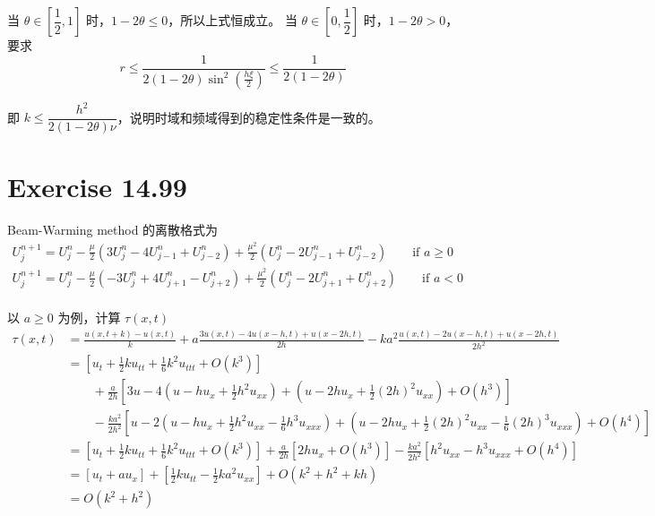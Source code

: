 \documentclass[a4paper]{article}
\begin{document}
\par 当 $\theta \in \left[\dfrac{1}{2}, 1\right]$ 时，$1-2\theta \leq 0$，所以上式恒成立。
当 $\theta \in \left[0, \dfrac{1}{2}\right]$ 时，$1-2\theta > 0$，要求
\begin{equation}
    r \leq \frac{1}{2(1-2\theta)\sin^2\left(\frac{h\xi}{2}\right)} \leq \frac{1}{2(1-2\theta)}
\end{equation}
\par 即 $k\leq \dfrac{h^2}{2(1-2\theta)\nu}$，说明时域和频域得到的稳定性条件是一致的。

\section*{Exercise 14.99}

\par Beam-Warming method 的离散格式为
\begin{equation}
    \begin{gathered}
        U_{j}^{n+1} = U_{j}^{n} - \frac{\mu}{2}
        \left(
            3U_{j}^{n}-4U_{j-1}^{n}+U_{j-2}^{n}
        \right) + \frac{\mu^2}{2}
        \left(
            U_{j}^{n}-2U_{j-1}^{n}+U_{j-2}^{n}
        \right) \qquad \text{if } a \geq 0\\
        U_{j}^{n+1} = U_{j}^{n} - \frac{\mu}{2}
        \left(
            -3U_{j}^{n}+4U_{j+1}^{n}-U_{j+2}^{n}
        \right) + \frac{\mu^2}{2}
        \left(
            U_{j}^{n}-2U_{j+1}^{n}+U_{j+2}^{n}
        \right) \qquad \text{if } a < 0\\
    \end{gathered}
\end{equation}
\par 以 $a \geq 0$ 为例，计算 $\tau(x,t)$ 
\begin{equation}
    \begin{aligned}
        \tau(x,t) &= \frac{u(x,t+k)-u(x,t)}{k} + a\frac{3u(x,t)-4u(x-h,t)+u(x-2h,t)}{2h} - ka^2\frac{u(x,t)-2u(x-h,t)+u(x-2h,t)}{2h^2}\\
        &= \left[
            u_t + \frac{1}{2}ku_{tt}+\frac{1}{6}k^2u_{ttt} + O(k^3)
        \right]\\
        &\qquad + \frac{a}{2h}\left[
            3u -4\left(u-hu_x+\frac{1}{2}h^2u_{xx}\right)
            +\left(u-2hu_x+\frac{1}{2}(2h)^2u_{xx}\right)
            + O(h^3)
        \right]\\
        &\qquad- \frac{ka^2}{2h^2}\left[
            u -2\left(u-hu_x+\frac{1}{2}h^2u_{xx}-\frac{1}{6}h^3u_{xxx}\right)
            +\left(u-2hu_x+\frac{1}{2}(2h)^2u_{xx}-\frac{1}{6}(2h)^3u_{xxx}\right)
            + O(h^4)
        \right]\\
        &= \left[
            u_t+\frac{1}{2}ku_{tt}+\frac{1}{6}k^2u_{ttt} + O(k^3)
        \right]
        +\frac{a}{2h}\left[
            2hu_x + O(h^3)
        \right]
        -\frac{ka^2}{2h^2}\left[
            h^2u_{xx}-h^3u_{xxx}+O(h^4)   
        \right]\\
        &= \left[
            u_t + au_x
        \right]
        +\left[
            \frac{1}{2}ku_{tt} - \frac{1}{2}ka^2u_{xx}
        \right]
        + O(k^2+h^2+kh)\\
        &= O(k^2+h^2)
    \end{aligned}
\end{equation}
\end{document}

